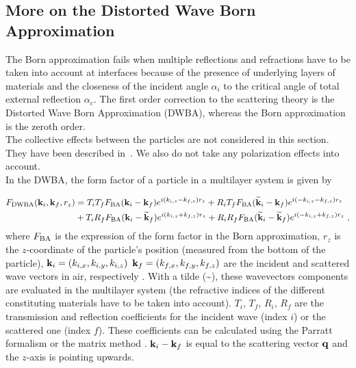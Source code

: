 \subsection{More on the Distorted Wave Born Approximation} 

The Born approximation fails when multiple reflections and refractions have to be taken into account at interfaces because of the presence of underlying layers of materials and the closeness of  the incident angle $\alpha_i$ to the critical angle of total external reflection $\alpha_c$. The first order correction to the scattering theory is the Distorted Wave Born Approximation (DWBA), whereas the Born approximation is the zeroth order. \\
The collective effects between the particles are not considered in this section. They have been described in~.  We also do not take any polarization effects into account. \\

 In the DWBA, the form factor of a particle in a multilayer system is given by

\begin{align}
F_{\rm{DWBA}} (\mathbf{k}_i,\mathbf{k}_f, r_z) & = T_i T_f F_{\rm{BA}} (\mathbf{k}_i-\mathbf{k}_f) e^{i (k_{i,z}-k_{f,z}) r_z} + R_i T_f F_{\rm{BA}}(\mathbf{\widetilde{k}}_i-\mathbf{k}_f) e^{i(-k_{i,z}-k_{f,z})r_z}
 \nonumber \\
  &+ T_i R_f F_{\rm{BA}}(\mathbf{k}_i-\mathbf{\widetilde{k}}_f)e^{i(k_{i,z}+k_{f,z})r_z} + R_iR_fF_{\rm{BA}} (\mathbf{\widetilde{k}}_i-\mathbf{\widetilde{k}}_f)e^{i(-k_{i,z}+k_{f,z})r_z} \; , \label{eq:dwbageneral}
\end{align}
where $F_{\rm{BA}}$ is the expression of the form factor in the Born approximation, $r_z$ is the $z$-coordinate of the particle's position (measured from the bottom of the particle), $\mathbf{k}_i=(k_{i,x}, k_{i,y}, k_{i,z})$ $\mathbf{k}_f=(k_{f,x}, k_{f,y}, k_{f,z})$ are the incident and scattered wave vectors in air, respectively \cite{RaSS95}. With a tilde (\~{}), these wavevectors components are evaluated in the multilayer system (the refractive indices of the different constituting materials have to be taken into account). 
$T_i$, $T_f$, $R_i$, $R_f$ are the transmission and reflection coefficients for the incident wave (index $i$) or the scattered one (index $f$). These coefficients can be calculated using the Parratt formalism \cite{Par54} or the matrix method \cite{BoWo99}. $\mathbf{k}_i-\mathbf{k}_f$ is equal to the scattering vector $\mathbf{q}$ and the $z$-axis is pointing upwards.\\

